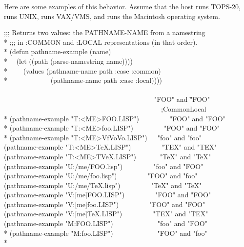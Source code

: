 \begin{newer}
\newpage%

Here are some examples of this behavior.  Assume that the host  runs
TOPS-20,  runs UNIX,  runs VAX/VMS, and  runs the Macintosh
operating system.
\begin{lisp}
;;; Returns two values: the PATHNAME-NAME from a namestring \\*
;;; in :COMMON and :LOCAL representations (in that order). \\*
(defun pathname-example (name) \\*
~~(let ((path (parse-namestring name)))) \\*
~~~~(values (pathname-name path :case :common) \\*
~~~~~~~~~~~~(pathname-name path :case :local)))) \\
\\
~~~~~~~~~~~~~~~~~~~~~~~~~~~~~~~~~~~~~~~~~~~\EV\ "FOO" \textrm{and} \="FOO" \kill
~~~~~~~~~~~~~~~~~~~~~~~~~~~~~~~~~~~~~~~~~~~~~~;\textrm{Common}\>\textrm{Local} \\*
(pathname-example "T:<ME>FOO.LISP")~~~~~~~~\EV\ "FOO" \textrm{and} "FOO" \\*
(pathname-example "T:<ME>foo.LISP")~~~~~~~~\EV\ "FOO" \textrm{and} "FOO" \\*
(pathname-example "T:<ME>{\Xcircumflex}Vf{\Xcircumflex}Vo{\Xcircumflex}Vo.LISP")~~\EV\ "foo" \textrm{and} "foo" \\
(pathname-example "T:<ME>TeX.LISP")~~~~~~~~\EV\ "TEX" \textrm{and} "TEX" \\
(pathname-example "T:<ME>T{\Xcircumflex}VeX.LISP")~~~~~~\EV\ "TeX" \textrm{and} "TeX" \\
(pathname-example "U:/me/FOO.lisp")~~~~~~~~\EV\ "foo" \textrm{and} "FOO" \\
(pathname-example "U:/me/foo.lisp")~~~~~~~~\EV\ "FOO" \textrm{and} "foo" \\
(pathname-example "U:/me/TeX.lisp")~~~~~~~~\EV\ "TeX" \textrm{and} "TeX" \\
(pathname-example "V:[me]FOO.LISP")~~~~~~~~\EV\ "FOO" \textrm{and} "FOO" \\
(pathname-example "V:[me]foo.LISP")~~~~~~~~\EV\ "FOO" \textrm{and} "FOO" \\
(pathname-example "V:[me]TeX.LISP")~~~~~~~~\EV\ "TEX" \textrm{and} "TEX" \\
(pathname-example "M:FOO.LISP")~~~~~~~~~~~~\EV\ "foo" \textrm{and} "FOO" \\*
(pathname-example "M:foo.LISP")~~~~~~~~~~~~\EV\ "FOO" \textrm{and} "foo" \\*

\end{lisp}
\end{newer}
